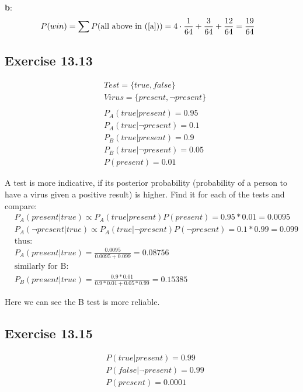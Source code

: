 \documentclass[12pt, a4paper]{article}
\begin{document}
            \textbf{b}:
            \begin{align*}
                &P(win) = \sum P(\text{all above in (\ref{a})}) = 4 \cdot \frac{1}{64} + \frac{3}{64} + \frac{12}{64} = \frac{19}{64}
            \end{align*}

        \subsection{Exercise 13.13}
            \begin{align*}
                &Test = \{true, false\} \\
                &Virus = \{present, \neg present\}\\
                \\
                &P_A(true|present) = 0.95\\
                &P_A(true|\neg present) = 0.1\\
                &P_B(true|present) = 0.9\\
                &P_B(true|\neg present) = 0.05\\
                &P(present) = 0.01
            \end{align*}

            A test is more indicative, if its posterior probability (probability of a person to have a virus given a positive result) is higher. Find it for each of the tests and compare:
            \begin{align*}
                &P_A(present|true) \propto P_A(true|present) P(present) = 0.95 * 0.01 = 0.0095\\
                &P_A(\neg present|true) \propto P_A(true|\neg present) P(\neg present) = 0.1 * 0.99 = 0.099\\
                &\text{thus:}\\
                &P_A(present|true) = \frac{0.0095}{0.0095 + 0.099} = 0.08756\\
                &\text{similarly for B:}\\
                &P_B(present|true) = \frac{0.9 * 0.01}{0.9 * 0.01 + 0.05 * 0.99} = 0.15385
            \end{align*}

            Here we can see the B test is more reliable.

        \subsection{Exercise 13.15}
            \begin{align*}
                &P(true|present) = 0.99\\
                &P(false|\neg present) = 0.99\\
                &P(present) = 0.0001
            \end{align*}
\end{document}
